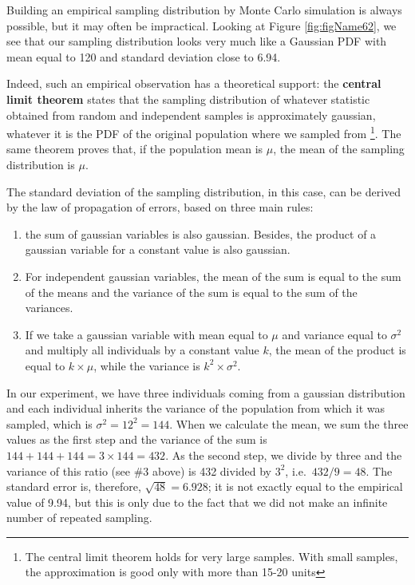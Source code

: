 \documentclass[a4paper,12pt,oneside]{book}
\providecommand{\tightlist}{%
  \setlength{\itemsep}{0pt}\setlength{\parskip}{0pt}}
\begin{document}
Building an empirical sampling distribution by Monte Carlo simulation is always possible, but it may often be impractical. Looking at Figure \ref{fig:figName62}, we see that our sampling distribution looks very much like a Gaussian PDF with mean equal to 120 and standard deviation close to 6.94.

Indeed, such an empirical observation has a theoretical support: the \textbf{central limit theorem} states that the sampling distribution of whatever statistic obtained from random and independent samples is approximately gaussian, whatever it is the PDF of the original population where we sampled from \footnote{The central limit theorem holds for very large samples. With small samples, the approximation is good only with more than 15-20 units}. The same theorem proves that, if the population mean is \(\mu\), the mean of the sampling distribution is \(\mu\).

The standard deviation of the sampling distribution, in this case, can be derived by the law of propagation of errors, based on three main rules:

\begin{enumerate}
\def\labelenumi{\arabic{enumi}.}
\tightlist
\item
  the sum of gaussian variables is also gaussian. Besides, the product of a gaussian variable for a constant value is also gaussian.
\item
  For independent gaussian variables, the mean of the sum is equal to the sum of the means and the variance of the sum is equal to the sum of the variances.
\item
  If we take a gaussian variable with mean equal to \(\mu\) and variance equal to \(\sigma^2\) and multiply all individuals by a constant value \(k\), the mean of the product is equal to \(k \times \mu\), while the variance is \(k^2 \times \sigma^2\).
\end{enumerate}

In our experiment, we have three individuals coming from a gaussian distribution and each individual inherits the variance of the population from which it was sampled, which is \(\sigma^2 = 12^2 = 144\). When we calculate the mean, we sum the three values as the first step and the variance of the sum is \(144 + 144 + 144 = 3 \times 144 = 432\). As the second step, we divide by three and the variance of this ratio (see \#3 above) is 432 divided by \(3^2\), i.e.~\(432/9 = 48\). The standard error is, therefore, \(\sqrt{48} = 6.928\); it is not exactly equal to the empirical value of 9.94, but this is only due to the fact that we did not make an infinite number of repeated sampling.
\end{document}
